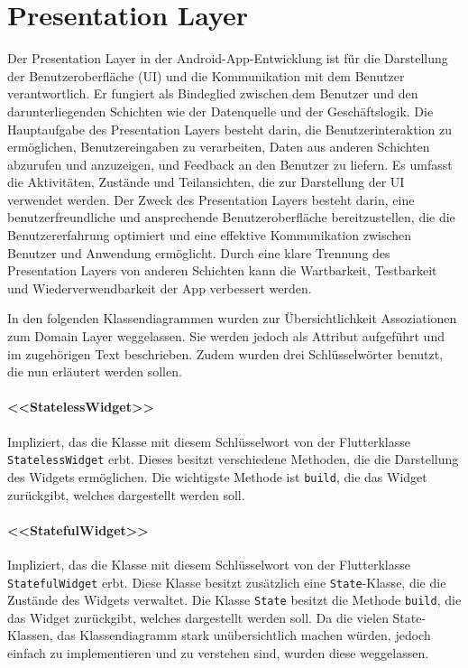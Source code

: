 \documentclass{entwurfsheft}
\begin{document}
\begin{sloppypar}
\section{Presentation Layer}\label{sec:presentationLayer}
Der Presentation Layer in der Android-App-Entwicklung ist für die Darstellung der Benutzeroberfläche (UI) und die Kommunikation mit dem Benutzer verantwortlich. Er fungiert als Bindeglied zwischen dem Benutzer und den darunterliegenden Schichten wie der Datenquelle und der Geschäftslogik. Die Hauptaufgabe des Presentation Layers besteht darin, die Benutzerinteraktion zu ermöglichen, Benutzereingaben zu verarbeiten, Daten aus anderen Schichten abzurufen und anzuzeigen, und Feedback an den Benutzer zu liefern. Es umfasst die Aktivitäten, Zustände und Teilansichten, die zur Darstellung der UI verwendet werden. Der Zweck des Presentation Layers besteht darin, eine benutzerfreundliche und ansprechende Benutzeroberfläche bereitzustellen, die die Benutzererfahrung optimiert und eine effektive Kommunikation zwischen Benutzer und Anwendung ermöglicht. Durch eine klare Trennung des Presentation Layers von anderen Schichten kann die Wartbarkeit, Testbarkeit und Wiederverwendbarkeit der App verbessert werden.

In den folgenden Klassendiagrammen wurden zur Übersichtlichkeit Assoziationen zum Domain Layer weggelassen. Sie werden jedoch als Attribut aufgeführt und im zugehörigen Text beschrieben. Zudem wurden drei Schlüsselwörter benutzt, die nun erläutert werden sollen.

\paragraph{<<StatelessWidget>>}
Impliziert, das die Klasse mit diesem Schlüsselwort von der Flutterklasse \texttt{StatelessWidget} erbt. Dieses besitzt verschiedene Methoden, die die Darstellung des Widgets ermöglichen. Die wichtigste Methode ist \texttt{build}, die das Widget zurückgibt, welches dargestellt werden soll.
\paragraph{<<StatefulWidget>>}
Impliziert, das die Klasse mit diesem Schlüsselwort von der Flutterklasse \texttt{StatefulWidget} erbt. Diese Klasse besitzt zusätzlich eine \texttt{State}-Klasse, die die Zustände des Widgets verwaltet. Die Klasse \texttt{State} besitzt die Methode \texttt{build}, die das Widget zurückgibt, welches dargestellt werden soll. Da die vielen State-Klassen, das Klassendiagramm stark unübersichtlich machen würden, jedoch einfach zu implementieren und zu verstehen sind, wurden diese weggelassen.

\end{sloppypar}
\end{document}
